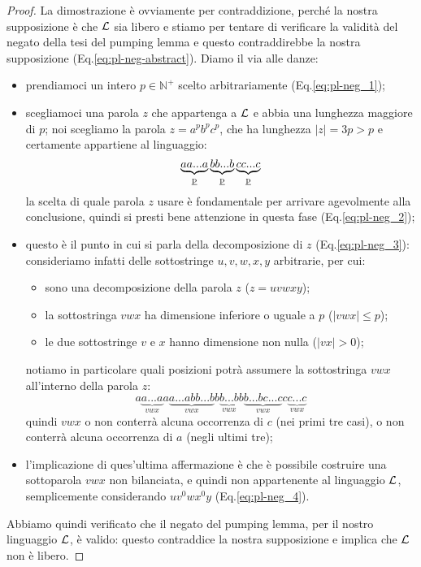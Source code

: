 \documentclass[class=book, crop=false, oneside, 12pt]{standalone}
\begin{document}
  \begin{proof}
    La dimostrazione è ovviamente per contraddizione, perché la nostra supposizione è che \(\mathcal{L}\) sia libero e stiamo per tentare di verificare la validità del negato della tesi del pumping lemma e questo contraddirebbe la nostra supposizione (Eq.\ref{eq:pl-neg-abstract}). Diamo il via alle danze:
    \begin{itemize}
      \item prendiamoci un intero \(p \in \mathbb{N}^+\) scelto arbitrariamente (Eq.\ref{eq:pl-neg_1});
      \item scegliamoci una parola \(z\) che appartenga a \(\mathcal{L}\) e abbia una lunghezza maggiore di \(p\); noi scegliamo la parola \(z = a^pb^pc^p\), che ha lunghezza \(|z| = 3p > p\) e certamente appartiene al linguaggio:
      \begin{equation*}
        \underbrace{aa...a}_\text{\emph{p}}\underbrace{bb...b}_\text{\emph{p}}\underbrace{cc...c}_\text{\emph{p}}
      \end{equation*}
      la scelta di quale parola \(z\) usare è fondamentale per arrivare agevolmente alla conclusione, quindi si presti bene attenzione in questa fase (Eq.\ref{eq:pl-neg_2});
      \item questo è il punto in cui si parla della decomposizione di \(z\) (Eq.\ref{eq:pl-neg_3}): consideriamo infatti delle sottostringe \(u, v, w, x, y\) arbitrarie, per cui:
      \begin{itemize}
        \item sono una decomposizione della parola \(z\) (\(z = uvwxy\));
        \item la sottostringa \(vwx\) ha dimensione inferiore o uguale a \(p\) (\(|vwx| \le p\));
        \item le due sottostringe \(v\) e \(x\) hanno dimensione non nulla (\(|vx| > 0\));
      \end{itemize}
      notiamo in particolare quali posizioni potrà assumere la sottostringa \(vwx\) all'interno della parola \(z\):
      \begin{equation*}
        a\underbrace{a...a}_{vwx}
        a\underbrace{a...abb...b}_{vwx}
        b\underbrace{b...b}_{vwx}
        b\underbrace{b...bc...c}_{vwx}
        c\underbrace{c...c}_{vwx}
      \end{equation*}
      quindi \(vwx\) o non conterrà alcuna occorrenza di \(c\) (nei primi tre casi), o non conterrà alcuna occorrenza di \(a\) (negli ultimi tre);
      \item l'implicazione di ques'ultima affermazione è che è possibile costruire una sottoparola \(vwx\) non bilanciata, e quindi non appartenente al linguaggio \(\mathcal{L}\), semplicemente considerando \(uv^0wx^0y\) (Eq.\ref{eq:pl-neg_4}).
    \end{itemize}
    Abbiamo quindi verificato che il negato del pumping lemma, per il nostro linguaggio \(\mathcal{L}\), è valido: questo contraddice la nostra supposizione e implica che \(\mathcal{L}\) non è libero.
  \end{proof}
\end{document}
